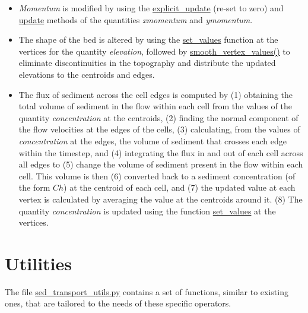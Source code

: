 \documentclass[10pt]{article}
\begin{document}
\begin{itemize}
\item \textit{Momentum} is modified by using the \url{explicit_update} (re-set to zero) and \url{update} methods of the quantities \textit{xmomentum} and \textit{ymomentum}.

\item The shape of the bed is altered by using the \url{set_values} function at the vertices for the quantity \textit{elevation}, followed by \url{smooth_vertex_values()} to eliminate discontinuities in the topography and distribute the updated elevations to the centroids and edges.

\item The flux of sediment across the cell edges is computed by (1) obtaining the total volume of sediment in the flow within each cell from the values of the quantity \textit{concentration} at the centroids, (2) finding the normal component of the flow velocities at the edges of the cells, (3) calculating, from the values of \textit{concentration} at the edges, the volume of sediment that crosses each edge within the timestep, and (4) integrating the flux in and out of each cell across all edges to (5) change the volume of sediment present in the flow within each cell. This volume is then (6) converted back to a sediment concentration (of the form $C h$) at the centroid of each cell, and (7) the updated value at each vertex is calculated by averaging the value at the centroids around it. (8) The quantity \textit{concentration} is updated using the function \url{set_values} at the vertices.
\end{itemize}

\section{Utilities} \label{utilities}

The file \url{sed_transport_utils.py} contains a set of functions, similar to existing ones, that are tailored to the needs of these specific operators.
\end{document}
